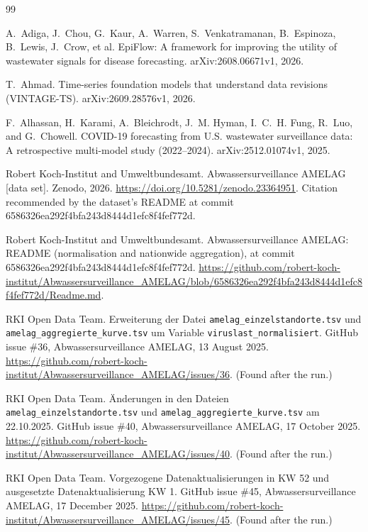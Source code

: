 \documentclass[11pt]{article}
\begin{document}
\begin{thebibliography}{99}\small
\raggedright

 A.~Adiga, J.~Chou, G.~Kaur, A.~Warren, S.~Venkatramanan, B.~Espinoza, B.~Lewis, J.~Crow, et al. EpiFlow: A framework for improving the utility of wastewater signals for disease forecasting. arXiv:2608.06671v1, 2026.

 T.~Ahmad. Time-series foundation models that understand data revisions (VINTAGE-TS). arXiv:2609.28576v1, 2026.

 F.~Alhassan, H.~Karami, A.~Bleichrodt, J.~M. Hyman, I.~C.~H. Fung, R.~Luo, and G.~Chowell. COVID-19 forecasting from U.S. wastewater surveillance data: A retrospective multi-model study (2022--2024). arXiv:2512.01074v1, 2025.

 Robert Koch-Institut and Umweltbundesamt. Abwassersurveillance AMELAG [data set]. Zenodo, 2026. \url{https://doi.org/10.5281/zenodo.23364951}. Citation recommended by the dataset's README at commit 6586326ea292f4bfa243d8444d1efc8f4fef772d.

 Robert Koch-Institut and Umweltbundesamt. Abwassersurveillance AMELAG: README (normalisation and nationwide aggregation), at commit 6586326ea292f4bfa243d8444d1efc8f4fef772d. \url{https://github.com/robert-koch-institut/Abwassersurveillance_AMELAG/blob/6586326ea292f4bfa243d8444d1efc8f4fef772d/Readme.md}.

 RKI Open Data Team. Erweiterung der Datei \texttt{amelag\_einzelstandorte.tsv} und \texttt{amelag\_aggregierte\_kurve.tsv} um Variable \texttt{viruslast\_normalisiert}. GitHub issue \#36, Abwassersurveillance AMELAG, 13 August 2025. \url{https://github.com/robert-koch-institut/Abwassersurveillance_AMELAG/issues/36}. (Found after the run.)

 RKI Open Data Team. \"Anderungen in den Dateien \texttt{amelag\_einzelstandorte.tsv} und \texttt{amelag\_aggregierte\_kurve.tsv} am 22.10.2025. GitHub issue \#40, Abwassersurveillance AMELAG, 17 October 2025. \url{https://github.com/robert-koch-institut/Abwassersurveillance_AMELAG/issues/40}. (Found after the run.)

 RKI Open Data Team. Vorgezogene Datenaktualisierungen in KW 52 und ausgesetzte Datenaktualisierung KW 1. GitHub issue \#45, Abwassersurveillance AMELAG, 17 December 2025. \url{https://github.com/robert-koch-institut/Abwassersurveillance_AMELAG/issues/45}. (Found after the run.)


\end{thebibliography}
\end{document}
